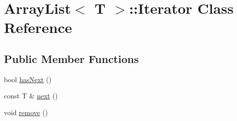 \hypertarget{class_array_list_1_1_iterator}{\section{Array\-List$<$ T $>$\-:\-:Iterator Class Reference}
\label{class_array_list_1_1_iterator}
}
\subsection*{Public Member Functions}
\begin{DoxyCompactItemize}
\item 
bool \hyperlink{class_array_list_1_1_iterator_a3ec467b1c0dc38962771d60f0764b77c}{has\-Next} ()
\item 
const T \& \hyperlink{class_array_list_1_1_iterator_af99af2084dbd38736b5dbb36c49cdcd5}{next} ()
\item 
void \hyperlink{class_array_list_1_1_iterator_a0b6d08951e0033616625d2329647d784}{remove} ()
\end{DoxyCompactItemize}



